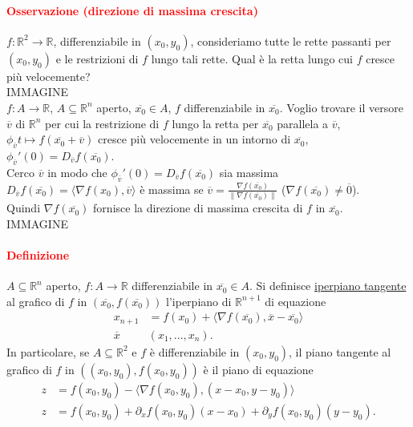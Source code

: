 \documentclass{article}
\newcommand{\R}{\mathbb{R}}
\begin{document}
\paragraph{\textcolor{red}{Osservazione (direzione di massima crescita)}}
$f:\R^2\rightarrow\R$, differenziabile in $(x_0,y_0)$, consideriamo tutte le rette passanti per $(x_0,y_0)$ e le restrizioni di $f$ lungo tali rette. Qual è la retta lungo cui $f$ cresce più velocemente?\\
IMMAGINE\\
$f:A \rightarrow\R$, $A\subseteq\R^n$ aperto, $\overline{x_0}\in A$, $f$ differenziabile in $\overline{x_0}$. Voglio trovare il versore $\overline{v}$ di $\R^n$ per cui la restrizione di $f$ lungo la retta per $\overline{x_0}$ parallela a $\overline{v}$, $\phi_{\overline{v}}t\mapsto f(\overline{x_0}+\overline{v})$ cresce più velocemente in un intorno di $\overline{x_0}$, $\phi_{\overline{v}}'(0)=D_{\overline{v}}f(\overline{x_0})$.\\
Cerco $\overline{v}$ in modo che $\phi_{\overline{v}}'(0)=D_{\overline{v}}f(\overline{x_0})$ sia massima $D_{\overline{v}}f(\overline{x_0})=\langle \nabla f(x_0),\overline{v} \rangle$ è massima se $\overline{v}=\frac{\nabla f(\overline{x_0})}{\|\nabla f(\overline{x_0})\|}$ ($\nabla f(\overline{x_0})\neq \overline{0}$).\\
Quindi $\nabla f(\overline{x_0})$ fornisce la direzione di massima crescita di $f$ in $\overline{x_0}$.\\
IMMAGINE\\

\paragraph{\textcolor{red}{Definizione}}
$A\subseteq\R^n$ aperto, $f:A \rightarrow \R$ differenziabile in $\overline{x_0}\in A$. Si definisce \underline{iperpiano tangente} al grafico di $f$ in $(\overline{x_0},f(\overline{x_0}))$ l'iperpiano di $\R^{n+1}$ di equazione
\begin{align*}
    x_{n+1}&=f(x_0)+\langle \nabla f(\overline{x_0}), \overline{x}-\overline{x_0} \rangle\\
    \overline{x}&(x_1,...,x_n).
\end{align*}
In particolare, se $A \subseteq \R^2$ e $f$ è differenziabile in $(x_0,y_0)$, il piano tangente al grafico di $f$ in $((x_0,y_0),f(x_0,y_0))$ è il piano di equazione
\begin{align*}
    z&=f(x_0,y_0)-\langle \nabla f(x_0,y_0),(x-x_0,y-y_0) \rangle\\
    z&=f(x_0,y_0)+\partial_xf(x_0,y_0)(x-x_0)+\partial_yf(x_0,y_0)(y-y_0).
\end{align*}
\end{document}
